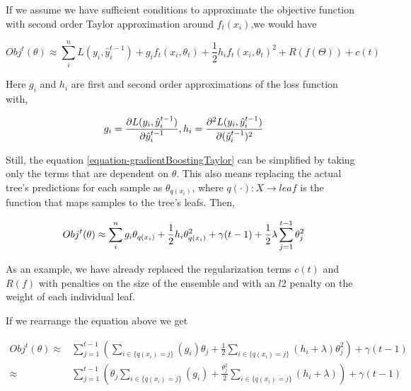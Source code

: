 If we assume we have sufficient conditions to approximate the objective function with second order Taylor approximation around $f_t(x_i)$,we would have

\begin{equation}\label{equation-gradientBoostingTaylor}
Obj^t(\theta) \approx \sum_i^n {L(y_i, \hat{y}^{t-1}_i) + g_i f_t(x_i,\theta_t) + \frac{1}{2} h_i f_t(x_i,\theta_t)^2 } +  R(f(\Theta)) +  c(t)
\end{equation}

Here $g_i$ and $h_i$ are first and second order approximations of the loss function with,

\[
g_i =  \frac{\partial L(y_i, \hat{y}^{t-1}_i)}{\partial \hat{y}^{t-1}_i}, \  \\
h_i =  \frac{\partial^2 L(y_i, \hat{y}^{t-1}_i)}{\partial (\hat{y}^{t-1}_i)^2 }
\]

Still, the equation \ref{equation-gradientBoostingTaylor} can be simplified by taking only the terms that are dependent on $\theta$. This also means replacing the actual tree's predictions for each sample as $\theta_{q(x_i)}$, where $q(\cdot): X \rightarrow leaf$ is the function that maps samples to the tree's leafs. Then,


\begin{equation} \label{eq:gb-objSteps1}
Obj^t(\theta) \approx  \sum_i^n {g_i \theta_{q(x_i)} + \frac{1}{2} h_i \theta_{q(x_i)}^2 } + \gamma ({t-1}) + \frac{1}{2}\lambda \sum_{j=1}^{t-1} \theta_j^2 \\
\end{equation}

As an example, we have already replaced the regularization terms $c(t)$ and $R(f)$ with penalties on the size of the ensemble and with an $l$2 penalty on the weight of each individual leaf. 

If we rearrange the equation above we get

\begin{equation} \label{eq:gb-objSteps1}
\begin{split}
Obj^t(\theta) \approx  & \sum_{j=1}^{t-1} \left(  \sum_{i \in \{q(x_i)=j\}} (g_i )\theta_{j} + \frac{1}{2} \sum_{i \in \{q(x_i)=j\}} (h_i + \lambda ) \theta_{j}^2  \right) + \gamma ({t-1}) \\
\approx  & \sum_{j=1}^{t-1} \left(  \theta_{j}\sum_{i \in \{q(x_i)=j\}} (g_i ) + \frac{\theta_{j}^2}{2} \sum_{i \in \{q(x_i)=j\}} (h_i + \lambda )  \right) + \gamma ({t-1}) 
\end{split}
\end{equation}

